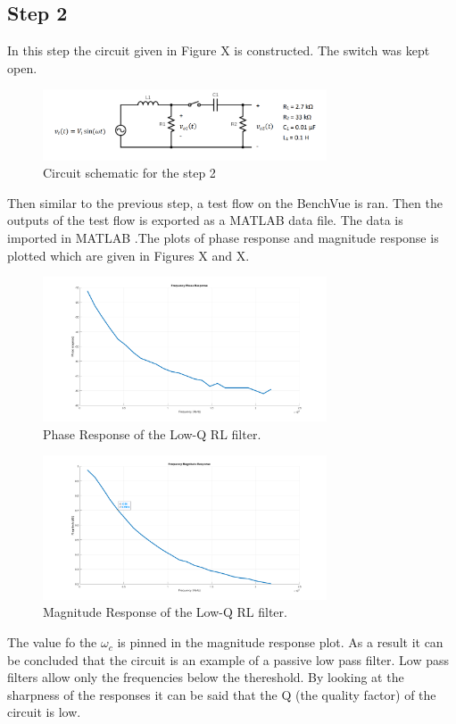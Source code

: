 \documentclass[letterpaper,12pt]{article}
\begin{document}
\subsection{Step 2}
In this step the circuit given in Figure X is constructed. The switch was kept open. 
\begin{figure}[H]
    \centering
    \includegraphics[width = 0.75\textwidth]{lowqlowpass.png}
    \caption{Circuit schematic for the step 2}
\end{figure} 
Then similar to the previous step, a test flow on the BenchVue is ran. Then the outputs of the test flow is exported as a MATLAB data file. The data is imported in MATLAB .The plots of phase response and magnitude response is plotted which are given in Figures X and X.
\begin{figure}[H]
    \centering
    \includegraphics[width = 0.75\textwidth]{2_1_2.png}
    \caption{Phase Response of the Low-Q RL filter.}
\end{figure} 

\begin{figure}[H]
    \centering
    \includegraphics[width = 0.75\textwidth]{2_1_1.png}
    \caption{Magnitude Response of the Low-Q RL filter.}
\end{figure} 
The value fo the \(\omega_c\) is pinned in the magnitude response plot. As a result it can be concluded that the circuit is an example of a passive low pass filter. Low pass filters allow only the frequencies below the thereshold.  By looking at the sharpness of the responses it can be said that the Q (the quality factor) of the circuit is low. 
    
\end{document}
